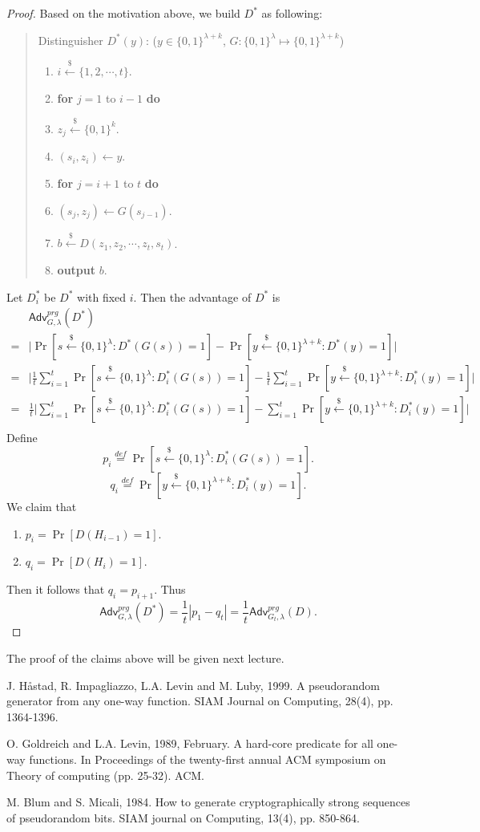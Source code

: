 \documentclass[12pt]{article}
\newcommand{\eqdef}{\stackrel{def}{=}}
\newcommand{\bits}{\{0,1\}}
\newcommand{\getsr}{\stackrel{\$}{\gets}}
\newcommand{\Adv}{\mathsf{Adv}}
\newcommand{\tab}{\hspace{0.3in}}
\theoremstyle{definition}
\begin{document}
\begin{proof}
Based on the motivation above, we build $D^*$ as following:
\begin{quote}
Distinguisher $D^* (y)$: ($y \in \bits^{\lambda+k}$, $G : \bits^\lambda \mapsto \bits^{\lambda+k}$)
\begin{enumerate}
\item $i \getsr \{1, 2, \cdots, t\}$.
\item {\bf for} $j=1$ to $i-1$ {\bf do}
\item \tab $z_j \getsr \bits^k$.
\item $(s_i, z_i) \gets y$.
\item {\bf for} $j=i+1$ to $t$ {\bf do}
\item \tab $(s_j, z_j) \gets G(s_{j-1})$.
\item $b \getsr D(z_1, z_2, \cdots, z_t, s_t)$.
\item {\bf output} $b$.
\end{enumerate}
\end{quote}
Let $D_i^*$ be $D^*$ with fixed $i$. Then the advantage of $D^*$ is
$$\begin{aligned}
&\Adv_{G,\lambda}^{prg}(D^*) \\
=& \bigg| \Pr[s \getsr \bits^\lambda : D^*(G(s)) = 1] - \Pr[y \getsr \bits^{\lambda+k} : D^*(y) = 1] \bigg| \\
=& \bigg| \frac{1}{t}\sum_{i=1}^t \Pr[s \getsr \bits^\lambda : D_i^*(G(s)) = 1] - \frac{1}{t}\sum_{i=1}^t \Pr[y \getsr \bits^{\lambda+k} : D_i^*(y) = 1] \bigg| \\
=& \frac{1}{t}\bigg| \sum_{i=1}^t \Pr[s \getsr \bits^\lambda : D_i^*(G(s)) = 1] - \sum_{i=1}^t \Pr[y \getsr \bits^{\lambda+k} : D_i^*(y) = 1] \bigg| \\
\end{aligned}$$
Define
$$p_i \eqdef \Pr[s \getsr \bits^\lambda : D_i^*(G(s)) = 1].$$
$$q_i \eqdef \Pr[y \getsr \bits^{\lambda+k} : D_i^*(y) = 1].$$
We claim that
\begin{enumerate}
\item $p_i = \Pr[D(H_{i-1}) = 1]$.
\item $q_i = \Pr[D(H_i) = 1]$.
\end{enumerate}
Then it follows that $q_i = p_{i+1}$. Thus
$$\Adv_{G,\lambda}^{prg}(D^*) = \frac{1}{t}|p_1 - q_t| = \frac{1}{t} \Adv_{G_t, \lambda}^{prg}(D).$$
\end{proof}
The proof of the claims above will be given next lecture.

\begin{thebibliography}{10}
J. H\aa stad, R. Impagliazzo, L.A. Levin and M. Luby, 1999. 
A pseudorandom generator from any one-way function. 
SIAM Journal on Computing, 28(4), pp. 1364-1396.
	
O. Goldreich and L.A. Levin, 1989, February. 
A hard-core predicate for all one-way functions. 
In Proceedings of the twenty-first annual ACM symposium on Theory of computing (pp. 25-32). ACM.

M. Blum and S. Micali, 1984. 
How to generate cryptographically strong sequences of pseudorandom bits. 
SIAM journal on Computing, 13(4), pp. 850-864.
\end{thebibliography}
\end{document}
